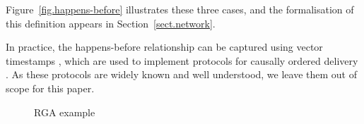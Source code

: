 Figure~\ref{fig.happens-before} illustrates these three cases, and the formalisation of this
definition appears in Section~\ref{sect.network}.

In practice, the happens-before relationship can be captured using vector timestamps
\cite{Schwarz:1994gl,Fidge:1988tv}, which are used to implement protocols for causally ordered
delivery \cite{Cachin:2011wt}. As these protocols are widely known and well understood, we leave
them out of scope for this paper.









\begin{figure}
\centering

\caption{RGA example}\label{fig.two-lists}
\end{figure}
